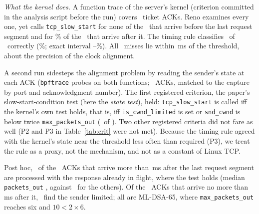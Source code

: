\documentclass[9pt]{article}
\newcommand{\ms}{\,ms\xspace}
\begin{document}
\emph{What the kernel does.} A function trace of the server's kernel (criterion committed in the analysis script before the run) covers \KerN\ ticket ACKs. Reno examines every one, yet calls \texttt{tcp\_slow\_start} for none of the \KerBeforeN\ that arrive before the last request segment and for \KerAfterSS\% of the \KerAfterN\ that arrive after it. The timing rule classifies \KerRight\ of \KerN\ correctly (\KerPct\%; exact interval \CiKerLo--\CiKerHi\%). All \KerWrong\ misses lie within \KerMissNear\ms of the threshold, about the precision of the clock alignment.

A second run sidesteps the alignment problem by reading the sender's state at each ACK (\texttt{bpftrace} probes on both functions; \StN\ ACKs, matched to the capture by port and acknowledgment number). The first registered criterion, the paper's slow-start-condition test (here the \emph{state test}), held: \texttt{tcp\_\allowbreak slow\_\allowbreak start} is called iff the kernel's own test holds, that is, iff \texttt{is\_\allowbreak cwnd\_\allowbreak limited} is set or \texttt{snd\_\allowbreak cwnd} is below twice \texttt{max\_\allowbreak packets\_\allowbreak out} (\StPOneRight\ of \StPOneN). Two other registered criteria did not fare as well (P2 and P3 in Table~\ref{tab:crit} were not met). Because the timing rule agreed with the kernel's state near the threshold less often than required (P3), we treat the rule as a proxy, not the mechanism, and not as a constant of Linux TCP.

Post hoc, \StLateInflight\ of the \StLate\ ACKs that arrive more than \RaceThr\ms after the last request segment are processed with the response already in flight, where the test holds (median \texttt{packets\_out} \StAfterPk, against \StBeforePk\ for the others). Of the \StEarly\ ACKs that arrive no more than \RaceThr\ms after it, \StEarlyLimited\ find the sender limited; all are ML-DSA-65, where \texttt{max\_packets\_out} reaches six and $10<2\times6$.
\end{document}
